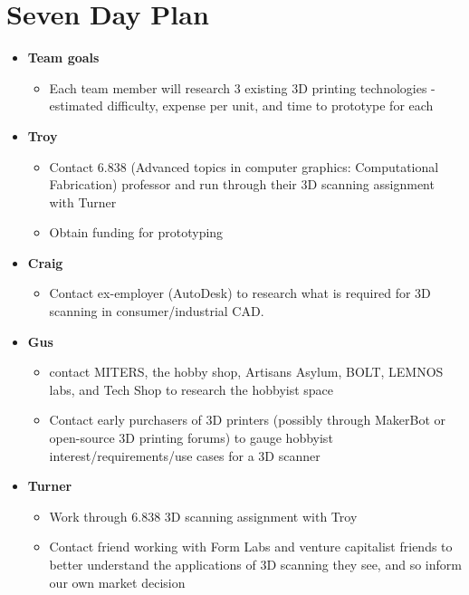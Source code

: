 \documentclass[10pt]{article}
\begin{document}
\section{Seven Day Plan} 
\begin{itemize} 
\item \textbf{Team goals}
\begin{itemize}
\item Each team member will research 3 existing 3D printing technologies - estimated difficulty,
    expense per unit, and time to prototype for each
\end{itemize}

\item \textbf{Troy}
\begin{itemize}
\item Contact 6.838 (Advanced topics in computer graphics: Computational Fabrication) professor and run
  through their 3D scanning assignment with Turner
\item Obtain funding for prototyping
\end{itemize}

\item \textbf{Craig}
\begin{itemize}
\item Contact ex-employer (AutoDesk) to research
  what is required for 3D scanning in consumer/industrial CAD. 
\end{itemize}

\item \textbf{Gus}
\begin{itemize}
\item contact MITERS, the hobby shop, Artisans Asylum, BOLT, LEMNOS labs, and
  Tech Shop to research the hobbyist space
\item Contact early purchasers of 3D printers (possibly through MakerBot or
  open-source 3D printing forums) to gauge hobbyist
  interest/requirements/use cases for a 3D scanner
\end{itemize}

\item \textbf{Turner}
\begin{itemize}
\item Work through 6.838 3D scanning assignment with Troy
\item Contact friend working with Form Labs and venture capitalist friends to
  better understand the applications of 3D scanning they see, and so inform our
  own market decision
\end{itemize}
\end{itemize}
\end{document}
